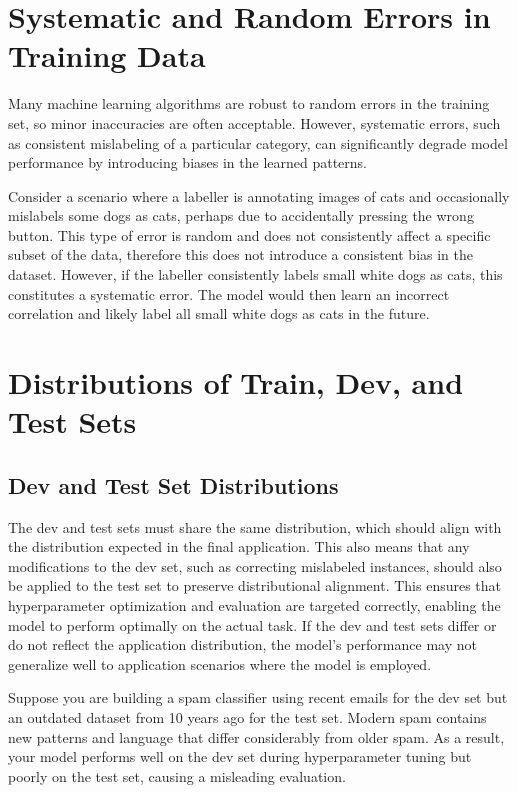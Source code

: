 \documentclass[12pt,openany]{book}
\begin{document}
\section{Systematic and Random Errors in Training Data}
Many machine learning algorithms are robust to random errors in the training set, so minor inaccuracies are often acceptable. However, systematic errors, such as consistent mislabeling of a particular category, can significantly degrade model performance by introducing biases in the learned patterns. \newline

\begin{examplebox}
Consider a scenario where a labeller is annotating images of cats and occasionally mislabels some dogs as cats, perhaps due to accidentally pressing the wrong button. This type of error is random and does not consistently affect a specific subset of the data, therefore this does not introduce a consistent bias in the dataset. However, if the labeller consistently labels small white dogs as cats, this constitutes a systematic error. The model would then learn an incorrect correlation and likely label all small white dogs as cats in the future. 
\end{examplebox}

\section{Distributions of Train, Dev, and Test Sets}

\subsection{Dev and Test Set Distributions}
The dev and test sets must share the same distribution, which should align with the distribution expected in the final application. This also means that any modifications to the dev set, such as correcting mislabeled instances, should also be applied to the test set to preserve distributional alignment. This ensures that hyperparameter optimization and evaluation are targeted correctly, enabling the model to perform optimally on the actual task. If the dev and test sets differ or do not reflect the application distribution, the model's performance may not generalize well to application scenarios where the model is employed. \newline

\begin{examplebox}
Suppose you are building a spam classifier using recent emails for the dev set but an outdated dataset from 10 years ago for the test set. Modern spam contains new patterns and language that differ considerably from older spam. As a result, your model performs well on the dev set during hyperparameter tuning but poorly on the test set, causing a misleading evaluation.
\end{examplebox}
\end{document}
